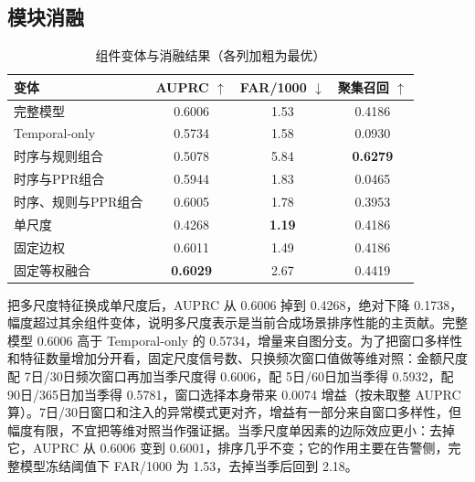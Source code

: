\documentclass[a4paper,fleqn]{cas-dc}
\begin{document}
\subsection{模块消融}
\begin{table}[pos=tbp]
\scriptsize
\setlength{\tabcolsep}{3pt}
\caption{组件变体与消融结果（各列加粗为最优）}
\begin{tabular*}{\tblwidth}{@{\extracolsep{\fill}}lccc@{}}
\toprule
变体 & AUPRC $\uparrow$ & FAR/1000 $\downarrow$ & 聚集召回 $\uparrow$ \\
\midrule
完整模型 & 0.6006 & 1.53 & 0.4186 \\
Temporal-only & 0.5734 & 1.58 & 0.0930 \\
时序与规则组合 & 0.5078 & 5.84 & \textbf{0.6279} \\
时序与PPR组合 & 0.5944 & 1.83 & 0.0465 \\
时序、规则与PPR组合 & 0.6005 & 1.78 & 0.3953 \\
单尺度 & 0.4268 & \textbf{1.19} & 0.4186 \\
固定边权 & 0.6011 & 1.49 & 0.4186 \\
固定等权融合 & \textbf{0.6029} & 2.67 & 0.4419 \\
\bottomrule
\end{tabular*}

\par\smallskip{}
\end{table}

把多尺度特征换成单尺度后，AUPRC 从 0.6006 掉到 0.4268，绝对下降 0.1738，幅度超过其余组件变体，说明多尺度表示是当前合成场景排序性能的主贡献。完整模型 0.6006 高于 Temporal-only 的 0.5734，增量来自图分支。为了把窗口多样性和特征数量增加分开看，固定尺度信号数、只换频次窗口值做等维对照：金额尺度配 7日/30日频次窗口再加当季尺度得 0.6006，配 5日/60日加当季得 0.5932，配 90日/365日加当季得 0.5781，窗口选择本身带来 0.0074 增益（按未取整 AUPRC 算）。7日/30日窗口和注入的异常模式更对齐，增益有一部分来自窗口多样性，但幅度有限，不宜把等维对照当作强证据。当季尺度单因素的边际效应更小：去掉它，AUPRC 从 0.6006 变到 0.6001，排序几乎不变；它的作用主要在告警侧，完整模型冻结阈值下 FAR/1000 为 1.53，去掉当季后回到 2.18。
\end{document}
